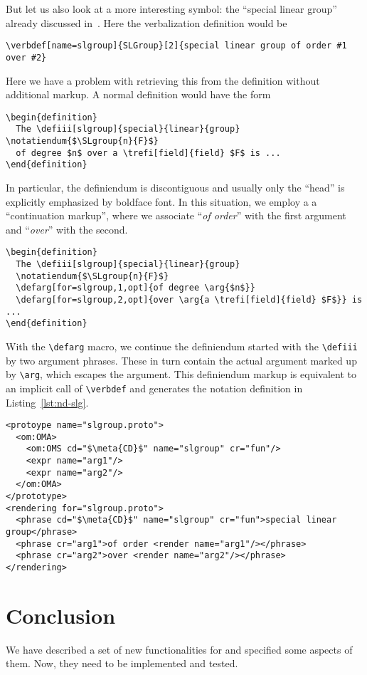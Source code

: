 \documentclass{bluenote}
\def\nlex#1{``\emph{#1}''}
\def\meta#1{\ensuremath{\langle\kern-.2em\langle\text{#1}\rangle\kern-.2em\rangle}}
\begin{document}
But let us also look at a more interesting symbol: the ``special linear group'' already
discussed in~\cite{Kohlhase:dmsmglom14}. Here the \sTeX verbalization definition would be 
\begin{lstlisting}
\verbdef[name=slgroup]{SLGroup}[2]{special linear group of order #1 over #2}
\end{lstlisting}
Here we have a problem with retrieving this from the definition without additional
markup. A normal definition would have the form
\begin{lstlisting}[label=lst:slg1,caption=A Discontiguous Definiendum]
\begin{definition}
  The \defiii[slgroup]{special}{linear}{group} \notatiendum{$\SLgroup{n}{F}$}
  of degree $n$ over a \trefi[field]{field} $F$ is ...
\end{definition}
\end{lstlisting}
In particular, the definiendum is discontiguous and usually only the ``head'' is
explicitly emphasized by boldface font. In this situation, we employ a a ``continuation
markup'', where we associate \nlex{of order} with the first argument and \nlex{over} with
the second. 
\begin{lstlisting}[label=lst:slg,caption=Continuation/Argument Markup for Discontiguous
  Definienda]
\begin{definition}
  The \defiii[slgroup]{special}{linear}{group}
  \notatiendum{$\SLgroup{n}{F}$}
  \defarg[for=slgroup,1,opt]{of degree \arg{$n$}} 
  \defarg[for=slgroup,2,opt]{over \arg{a \trefi[field]{field} $F$}} is ...
\end{definition}
\end{lstlisting}
With the \lstinline|\defarg| macro, we continue the definiendum started with the
\lstinline|\defiii| by two argument phrases. These in turn contain the actual argument
marked up by \lstinline|\arg|, which escapes the argument. This definiendum markup is
equivalent to an implicit call of \lstinline|\verbdef| and generates the notation
definition in Listing~\ref{lst:nd-slg}. 
\begin{lstlisting}[language={[1.3]OMDoc},mathescape,
  label=lst:nd-slg,caption=Verbalization Definition induced by Listing \ref{lst:slg}]
<protoype name="slgroup.proto">
  <om:OMA>
    <om:OMS cd="$\meta{CD}$" name="slgroup" cr="fun"/>
    <expr name="arg1"/>
    <expr name="arg2"/>
  </om:OMA>
</prototype>
<rendering for="slgroup.proto">
  <phrase cd="$\meta{CD}$" name="slgroup" cr="fun">special linear group</phrase>
  <phrase cr="arg1">of order <render name="arg1"/></phrase>
  <phrase cr="arg2">over <render name="arg2"/></phrase>
</rendering>
\end{lstlisting}

\section{Conclusion}
We have described a set of new functionalities for \sTeX and specified some aspects of
them. Now, they need to be implemented and tested. 

\printbibliography
\end{document}

